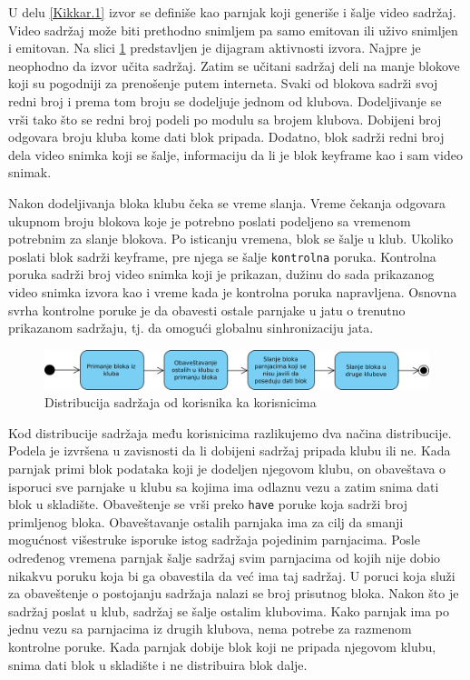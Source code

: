 \documentclass[12pt,oneside]{memoir}
\begin{document}
U delu \ref{Kikkar.1} izvor se definiše kao parnjak koji generiše i šalje video sadržaj. Video sadržaj može biti prethodno snimljem pa samo emitovan ili uživo snimljen i emitovan. Na slici \ref{fig:distribucija-izvor} predstavljen je dijagram aktivnosti izvora. Najpre je neophodno da izvor učita sadržaj. Zatim se učitani sadržaj deli na manje blokove koji su pogodniji za prenošenje putem interneta. Svaki od blokova sadrži svoj redni broj i prema tom broju se dodeljuje jednom od klubova. Dodeljivanje se vrši tako što se redni broj podeli po modulu sa brojem klubova. Dobijeni broj odgovara broju kluba kome dati blok pripada. Dodatno, blok sadrži redni broj dela video snimka koji se šalje, informaciju da li je blok keyframe kao i sam video snimak.

Nakon dodeljivanja bloka klubu čeka se vreme slanja. Vreme čekanja odgovara ukupnom broju blokova koje je potrebno poslati podeljeno sa vremenom potrebnim za slanje blokova. Po isticanju vremena, blok se šalje u klub. Ukoliko poslati blok sadrži keyframe, pre njega se šalje \texttt{kontrolna} poruka. Kontrolna poruka sadrži broj video snimka koji je prikazan, dužinu do sada prikazanog video snimka izvora kao i vreme kada je kontrolna poruka napravljena. Osnovna svrha kontrolne poruke je da obavesti ostale parnjake u jatu o trenutno prikazanom sadržaju, tj. da omogući globalnu sinhronizaciju jata. 


\begin{figure}[!ht]
  \centering
  \includegraphics[width=1.05\textwidth]{slike/distribucija-jato.jpg}
  \caption{Distribucija sadržaja od korisnika ka korisnicima}
  \label{fig:distribucija-izvor}
\end{figure}
\par

Kod distribucije sadržaja među korisnicima razlikujemo dva načina distribucije. Podela je izvršena u zavisnosti da li dobijeni sadržaj pripada klubu ili ne. Kada parnjak primi blok podataka koji je dodeljen njegovom klubu, on obaveštava o isporuci sve parnjake u klubu sa kojima ima odlaznu vezu a zatim snima dati blok u skladište. Obaveštenje se vrši preko \texttt{have} poruke koja sadrži broj primljenog bloka. Obaveštavanje ostalih parnjaka ima za cilj da smanji mogućnost višestruke isporuke istog sadržaja pojedinim parnjacima. Posle određenog vremena parnjak šalje sadržaj svim parnjacima od kojih nije dobio nikakvu poruku koja bi ga obavestila da već ima taj sadržaj. U poruci koja služi za obaveštenje o postojanju sadržaja nalazi se broj prisutnog bloka. Nakon što je sadržaj poslat u klub, sadržaj se šalje ostalim klubovima. Kako parnjak ima po jednu vezu sa parnjacima iz drugih klubova, nema potrebe za razmenom kontrolne poruke. Kada parnjak dobije blok koji ne pripada njegovom klubu, snima dati blok u skladište i ne distribuira blok dalje. 
\end{document}
